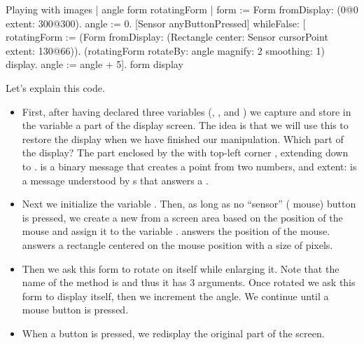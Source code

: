 \documentclass[a4paper,10pt,twoside]{book}
\begin{document}
\begin{script}{Playing with images}
| angle form rotatingForm |
form := Form fromDisplay: (0@0 extent: 300@300).
angle := 0.
[Sensor anyButtonPressed] whileFalse: [
   rotatingForm := (Form fromDisplay:
               (Rectangle 
                    center: Sensor cursorPoint 
                    extent: 130@66)).
   (rotatingForm 
      rotateBy: angle	
      magnify: 2 
      smoothing: 1) display.
   angle := angle + 5].
form display
\end{script}

Let's explain this code.
\begin{itemize}
\item First, after having declared three variables (, , and ) we capture and store in the variable  a part of the display screen.
The idea is that we will use this to restore the display when we have finished our manipulation. 
Which part of the display? 
The part enclosed by the  with top-left corner , extending down to .
 is a binary message that creates a point from two numbers, and extent: is a message understood by s that answers a .
\item Next we initialize the variable . Then, as long as no ``sensor'' (\ie{} mouse) button is pressed, we create a new  from a screen area based on the position of the
mouse and assign it to the variable .  answers the position of the mouse.  answers a rectangle centered on the mouse position with a size of  pixels.
\item Then we ask this form to rotate on itself while enlarging it. 
Note that the name of the method is 
and thus it has 3 arguments. Once rotated we ask this form to display itself, 
then we increment the angle. We continue until a mouse button is pressed.
\item When a button is pressed, we redisplay the original part of the screen.
\end{itemize}

\ifx\wholebook\relax\else
\end{document}

